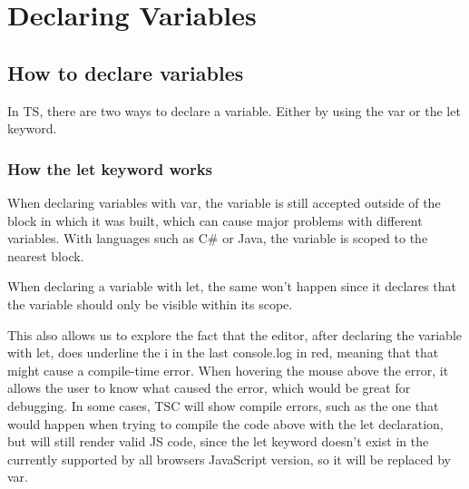 \chapter{Declaring Variables}
\section{How to declare variables}
In TS, there are two ways to declare a variable. Either by using the var or the let keyword.

\subsection{How the let keyword works}
When declaring variables with var, the variable is still accepted outside of the block in which it was built, which can cause major problems with different variables. With languages such as C# or Java, the variable is scoped to the nearest block.

When declaring a variable with let, the same won't happen since it declares that the variable should only be visible within its scope.

This also allows us to explore the fact that the editor, after declaring the variable with let, does underline the i in the last console.log in red, meaning that that might cause a compile-time error. When hovering the mouse above the error, it allows the user to know what caused the error, which would be great for debugging. In some cases, TSC will show compile errors, such as the one that would happen when trying to compile the code above with the let declaration, but will still render valid JS code, since the let keyword doesn't exist in the currently supported by all browsers JavaScript version, so it will be replaced by var.